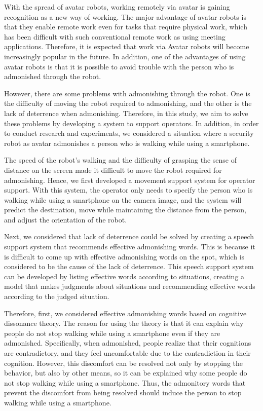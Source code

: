 \documentclass{kuisthesis}
\begin{document}
\begin{eabstract}
With the spread of avatar robots, working remotely via avatar is 
gaining recognition as a new way of working. The major advantage of 
avatar robots is that they enable remote work even for tasks that require 
physical work, which has been difficult with such conventional remote work as using
meeting applications. 
Therefore, it is expected that work via Avatar robots 
will become increasingly popular in the future. In addition, one of the advantages of using avatar robots is that
it is possible to avoid trouble with the person who is admonished through
the robot.

However, there are some problems with admonishing through the robot.
One is the difficulty of moving the robot required to
admonishing, and the other is the lack of deterrence when admonishing.
Therefore, in this study, we aim to solve these problems by developing a system to support operators.
In addition, in order to conduct research and experiments, we considered a situation where a security 
robot as avatar admonishes a person who is walking while using a smartphone.

The speed of the robot's walking and the difficulty of grasping the sense of distance
on the screen made it difficult to move the robot required for admonishing.
Hence, we first developed a movement support system for operator support.
With this system, the operator only needs to specify the person who is walking while using a smartphone
on the camera image, and the system will predict the destination, move while maintaining the distance from the person,
and adjust the orientation of the robot.

Next, we considered that lack of deterrence could be solved by creating a speech support system that recommends effective admonishing words.
This is because it is difficult to come up with effective admonishing words on the spot, which is considered to be the cause of the lack of deterrence.
This speech support system can be developed by listing effective words according to situations, creating a model that makes judgments about situations 
and recommending effective words according to the judged situation.

Therefore, first, we considered effective admonishing words based on cognitive dissonance theory.
The reason for using the theory is that it can explain why people do not stop walking while using a smartphone even if they are admonished.
Specifically, when admonished, people realize that their cognitions are contradictory, 
and they feel uncomfortable due to the contradiction in their cognition.
However, this discomfort can be resolved not only by stopping the behavior, but also by other means, 
so it can be explained why some people do not stop walking while using a smartphone.
Thus, the admonitory words that prevent the discomfort from being resolved should induce the person to stop walking while using a smartphone.


\end{eabstract}
\end{document}
